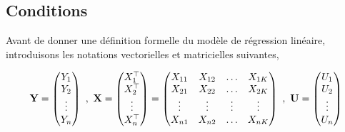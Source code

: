 \subsection{Conditions}
Avant de donner une définition formelle du modèle de régression linéaire, introduisons les notations vectorielles et matricielles suivantes,

\begin{align*}
\mathbf Y=
\begin{pmatrix}
Y_1\\
Y_2\\
\vdots\\
Y_n
\end{pmatrix}
\  , \
\mathbf X=
\begin{pmatrix}
X_1^\top\\
X_2^\top\\
\vdots\\
X_n^\top
\end{pmatrix}
=
\begin{pmatrix}
X_{11} & X_{12}&\ldots&X_{1K}\\
X_{21} & X_{22}&\ldots&X_{2K}\\
\vdots&\vdots&\vdots&\vdots\\
X_{n1} & X_{n2}&\ldots&X_{nK}
\end{pmatrix}
\  , \
\mathbf U=
\begin{pmatrix}
U_1\\
U_2\\
\vdots\\
U_n
\end{pmatrix}
\end{align*}

